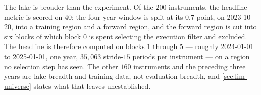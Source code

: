 The lake is broader than the experiment. Of the $200$ instruments, the headline metric is scored on
$40$; the four-year window is split at its $0.7$ point, on 2023-10-20, into a training region and a
forward region, and the forward region is cut into six blocks of which block $0$ is spent selecting
the execution filter and excluded. The headline is therefore computed on blocks $1$ through $5$ ---
roughly 2024-01-01 to 2025-01-01, one year, $35{,}063$ stride-$15$ periods per instrument --- on a
region no selection step has seen. The other $160$ instruments and the preceding three years are
lake breadth and training data, not evaluation breadth, and \cref{sec:lim-universe} states what
that leaves unestablished.
